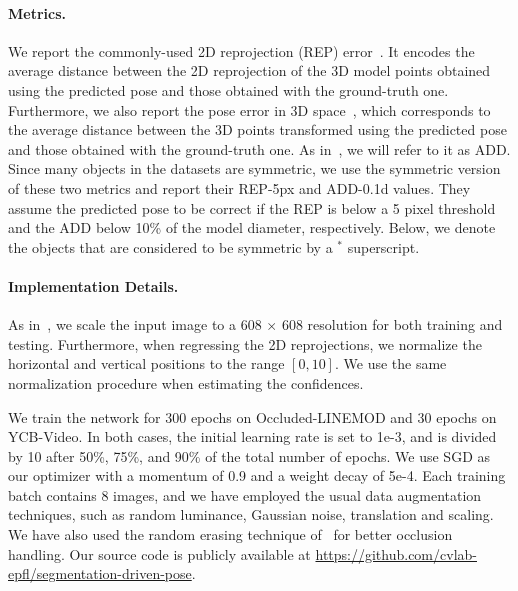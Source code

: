 \documentclass[10pt,twocolumn,letterpaper]{article}
\newcommand{\parag}[1]{\vspace{-3mm}\paragraph{#1}}
\begin{document}
\parag{Metrics.}


We report the commonly-used 2D reprojection (REP) error~\cite{Brachmann16a}. It encodes the average distance between the 2D reprojection of the 3D model points obtained using the predicted pose and those obtained with the ground-truth one. Furthermore, we also report the pose error in 3D space~\cite{Hinterstoisser12b}, which corresponds to the average distance between the 3D points transformed using the predicted pose and those obtained with the ground-truth one. As in~\cite{Li18a, Xiang18b}, we will refer to it as ADD. Since many objects in the datasets are symmetric,  we use the symmetric version of these two metrics and report their REP-5px and ADD-0.1d values. They assume the predicted pose to be correct if the REP is below a 5 pixel threshold and the ADD below 10\% of the model diameter, respectively. Below, we denote the objects that are considered to be symmetric by a $^*$ superscript. 

\parag{Implementation Details.}
As in~\cite{Redmon18}, we scale the input image to a 608 $\times$ 608 resolution for both training and testing. Furthermore, when regressing the 2D reprojections, we normalize the horizontal and vertical positions to the range $[0,10]$. We use the same normalization procedure when estimating the confidences.

We train the network for 300 epochs on Occluded-LINEMOD and 30 epochs on YCB-Video. In both cases, the initial learning rate is set to 1e-3, and is divided by 10 after 50\%, 75\%, and 90\% of the total number of epochs. We use SGD as our optimizer with a momentum of 0.9 and a weight decay of 5e-4. Each training batch contains 8 images, and we have employed the usual data augmentation techniques, such as random luminance, Gaussian noise, translation and scaling. We have also used the random erasing technique of~\cite{Zhong17} for better occlusion handling. Our source code is publicly available at \href{https://github.com/cvlab-epfl/segmentation-driven-pose}{https://github.com/cvlab-epfl/segmentation-driven-pose}.
\end{document}
